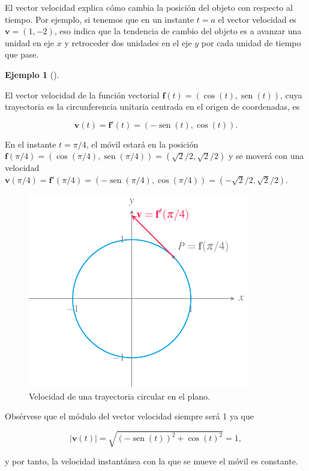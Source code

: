 \documentclass[
  a4paper,
]{scrreport}
\theoremstyle{definition}
\newtheorem{example}{Ejemplo}[chapter]
\theoremstyle{plain}
\theoremstyle{definition}
\theoremstyle{definition}
\theoremstyle{plain}
\theoremstyle{plain}
\theoremstyle{remark}
\begin{document}
El vector velocidad explica cómo cambia la posición del objeto con
respecto al tiempo. Por ejemplo, si tenemos que en un instante \(t=a\)
el vector velocidad es \(\mathbf{v}=(1,-2)\), eso indica que la
tendencia de cambio del objeto es a avanzar una unidad en eje \(x\) y
retroceder dos unidades en el eje \(y\) por cada unidad de tiempo que
pase.

\begin{example}[]\protect\hypertarget{exm-movimiento-curvilineo-plano}{}\label{exm-movimiento-curvilineo-plano}

El vector velocidad de la función vectorial
\(\mathbf{f}(t) = (\cos(t),\operatorname{sen}(t))\), cuya trayectoria es
la circunferencia unitaria centrada en el origen de coordenadas, es

\[
\mathbf{v}(t) 
= \mathbf{f}'(t) 
= (-\operatorname{sen}(t), \cos(t)).
\]

En el instante \(t=\pi/4\), el móvil estará en la posición
\(\mathbf{f}(\pi/4) = (\cos(\pi/4),\operatorname{sen}(\pi/4)) =(\sqrt{2}/2,\sqrt{2}/2)\)
y se moverá con una velocidad
\(\mathbf{v}(\pi/4)=\mathbf{f}'(\pi/4)=(-\operatorname{sen}(\pi/4),\cos(\pi/4))=(-\sqrt{2}/2,\sqrt{2}/2)\).

\begin{figure}[H]

{\centering \includegraphics{img/funciones-vectoriales/velocidad-trayectoria-circular.pdf}

}

\caption{Velocidad de una trayectoria circular en el plano.}

\end{figure}%

Obsérvese que el módulo del vector velocidad siempre será 1 ya que

\[
|\mathbf{v}(t)|=\sqrt{(-\operatorname{sen}(t))^2+\cos(t)^2}=1,
\]

y por tanto, la velocidad instantánea con la que se mueve el móvil es
constante.

\end{example}
\end{document}
